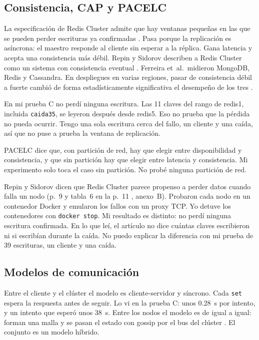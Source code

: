\documentclass[11pt,a4paper]{article}
\begin{document}
\subsection{Consistencia, CAP y PACELC}

La especificación de Redis Cluster admite que hay ventanas pequeñas en las que se pueden perder escrituras ya confirmadas \cite{redis2026clusterspec}. Pasa porque la replicación es asíncrona: el maestro responde al cliente sin esperar a la réplica. Gana latencia y acepta una consistencia más débil. Repin y Sidorov describen a Redis Cluster como un sistema con consistencia eventual \cite{repin2025distributed}. Ferreira et~al.\ midieron MongoDB, Redis y Cassandra. En despliegues en varias regiones, pasar de consistencia débil a fuerte cambió de forma estadísticamente significativa el desempeño de los tres \cite{ferreira2024impacts}.

En mi prueba C no perdí ninguna escritura. Las 11 claves del rango de redis1, incluida \texttt{caida35}, se leyeron después desde redis5. Eso no prueba que la pérdida no pueda ocurrir. Tengo una sola escritura cerca del fallo, un cliente y una caída, así que no puse a prueba la ventana de replicación.

PACELC dice que, con partición de red, hay que elegir entre disponibilidad y consistencia, y que sin partición hay que elegir entre latencia y consistencia. Mi experimento solo toca el caso sin partición. No probé ninguna partición de red.

Repin y Sidorov dicen que Redis Cluster parece propenso a perder datos cuando falla un nodo (p.~9 y tabla~6 en la p.~11 \cite{repin2025distributed}, anexo~B). Probaron cada nodo en un contenedor Docker y emularon los fallos con un proxy TCP. Yo detuve los contenedores con \texttt{docker stop}. Mi resultado es distinto: no perdí ninguna escritura confirmada. En lo que leí, el artículo no dice cuántas claves escribieron ni si escribían durante la caída. No puedo explicar la diferencia con mi prueba de 39 escrituras, un cliente y una caída.

\subsection{Modelos de comunicación}

Entre el cliente y el clúster el modelo es cliente-servidor y síncrono. Cada \texttt{set} espera la respuesta antes de seguir. Lo vi en la prueba C: unos 0.28~s por intento, y un intento que esperó unos 38~s. Entre los nodos el modelo es de igual a igual: forman una malla y se pasan el estado con gossip por el bus del clúster \cite{redis2026clusterspec}. El conjunto es un modelo híbrido.
\end{document}
